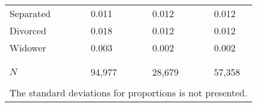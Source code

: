 \begin{table}[ht]
\begin{tabular}{llrrlrrlrr}
  \phantom{M}Separated &  & 0.011 &  &  & 0.012 &  &  & 0.012 &  \\ 
  \phantom{M}Divorced &  & 0.018 &  &  & 0.012 &  &  & 0.012 &  \\ 
  \phantom{M}Widower &  & 0.003 &  &  & 0.002 &  &  & 0.002 &  \\ 
    \\[-1.8ex] \hline \\[-1.8ex]  \multicolumn{2}{l}{ $ N $ }  &  \multicolumn{2}{c}{94,977} & & \multicolumn{2}{c}{28,679} & & \multicolumn{2}{c}{57,358} \\  \bottomrule   
 \\[-1.8ex] \multicolumn{10}{l}{\scriptsize{The standard deviations for proportions is 
               not presented.}} 
\end{tabular}
\end{table}
